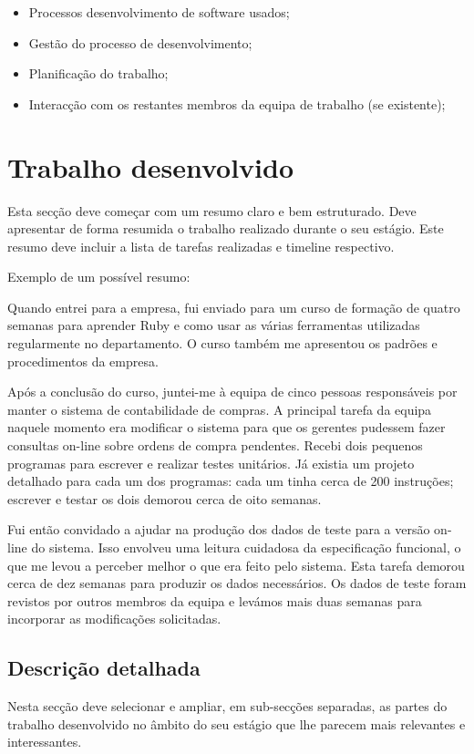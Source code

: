 \documentclass{article}
\begin{document}
\begin{itemize}
    
\item Processos desenvolvimento de software usados;
\item Gestão do processo de desenvolvimento;
\item Planificação do trabalho;
\item Interacção com os restantes membros da equipa de trabalho (se existente);

\end{itemize}

\cleardoublepage
\section{Trabalho desenvolvido}
Esta secção deve começar com um resumo claro e bem estruturado. Deve apresentar de forma resumida o trabalho realizado durante o seu estágio. Este resumo deve incluir a lista de tarefas realizadas e timeline respectivo.

Exemplo de um possível resumo:

Quando entrei para a empresa, fui enviado para um curso de formação de quatro semanas para aprender Ruby e como usar as várias ferramentas utilizadas regularmente no departamento. O curso também me apresentou os padrões e procedimentos da empresa.

Após a conclusão do curso, juntei-me à equipa de cinco pessoas responsáveis por manter o sistema de contabilidade de compras. A principal tarefa da equipa naquele momento era modificar o sistema para que os gerentes pudessem fazer consultas on-line sobre ordens de compra pendentes. Recebi dois pequenos programas para escrever e realizar testes unitários. Já existia um projeto detalhado para cada um dos programas: cada um tinha cerca de 200 instruções; escrever e testar os dois demorou cerca de oito semanas.

Fui então convidado a ajudar na produção dos dados de teste para a versão on-line do sistema. Isso envolveu uma leitura cuidadosa da especificação funcional, o que me levou a perceber melhor o que era feito pelo sistema. Esta tarefa demorou cerca de dez semanas para produzir os dados necessários. Os dados de teste foram revistos por outros membros da equipa e levámos mais duas semanas para incorporar as modificações solicitadas.

\subsection{Descrição detalhada}
Nesta secção deve  selecionar e ampliar, em sub-secções separadas, as partes do trabalho desenvolvido no âmbito do seu estágio que lhe parecem mais relevantes e interessantes.
\end{document}
